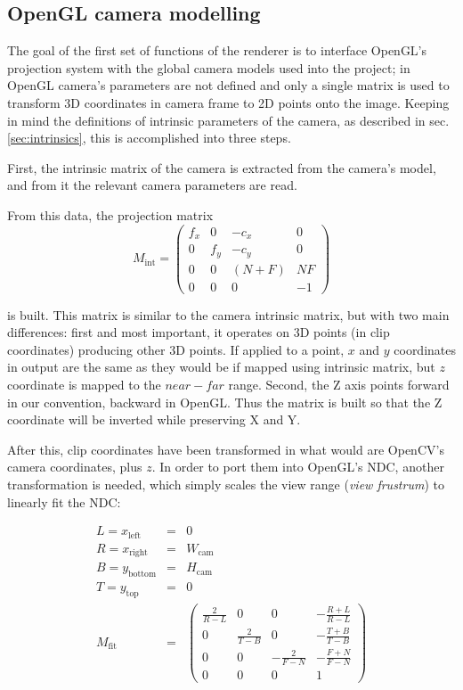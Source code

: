 \subsection{OpenGL camera modelling}
The goal of the first set of functions of the renderer is to interface OpenGL's
projection system with the global camera models used into the project; in
OpenGL camera's parameters are not defined and only a single matrix is used to
transform 3D coordinates in camera frame to 2D points onto the image. Keeping in
mind the definitions of intrinsic parameters of the camera, as described in sec.
\ref{sec:intrinsics}, this is accomplished into three steps.

First, the intrinsic matrix of the camera is extracted from the
camera's model, and from it the relevant camera parameters are read.

From this data, the projection matrix 
\begin{equation}
  M_{\text{int}}=\begin{pmatrix}
    f_x & 0 & -c_x & 0\\
    0 & f_y & -c_y & 0\\
    0 & 0 & (N+F) & NF \\
    0 & 0 & 0 & -1 
  \end{pmatrix}
\end{equation}

is built. This matrix is similar to the camera intrinsic matrix, but with two
main differences: first and most important, it operates on 3D points (in clip
coordinates) producing
other 3D points. If applied to a point, $x$ and $y$ coordinates in output are the same as they would be
if mapped using intrinsic matrix, but $z$ coordinate is mapped to the $near-far$
range. Second, the Z axis points forward in our convention, backward in OpenGL.
Thus the matrix is built so that the Z coordinate will be inverted while
preserving X and Y.

After this, clip coordinates have been transformed in what would are OpenCV's
camera coordinates, plus $z$. In order to port them into OpenGL's NDC, another
transformation is needed, which simply scales the view range (\emph{view
frustrum}) to linearly fit the NDC:

\begin{eqnarray}
  L = x_{\text{left}} & = & 0 \nonumber \\
  R = x_{\text{right}} & = & W_{\text{cam}} \nonumber \\
  B = y_{\text{bottom}} & = & H_{\text{cam}} \nonumber \\
  T = y_{\text{top}} & = & 0 \nonumber \\
  M_{\text{fit}} & = & 
  \begin{pmatrix}
    \frac{2}{R-L} & 0 & 0 & -\frac{R+L}{R-L} \\
    0 & \frac{2}{T-B} & 0 & -\frac{T+B}{T-B} \\
    0 & 0 & -\frac{2}{F-N} & -\frac{F+N}{F-N} \\
    0 & 0 & 0 & 1
  \end{pmatrix}
\end{eqnarray}


